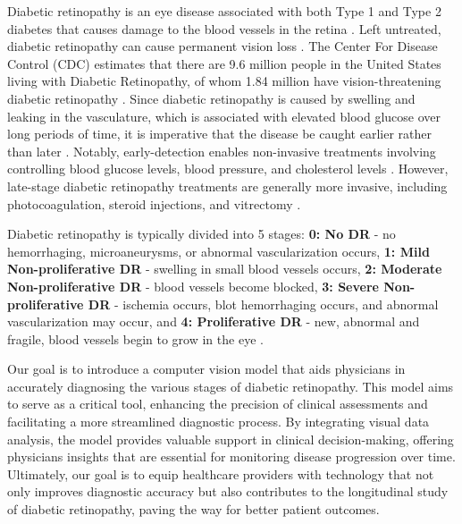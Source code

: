 Diabetic retinopathy is an eye disease associated with both Type 1 and Type 2 diabetes that causes damage to the blood vessels in the retina \cite{noauthor_diabetic_nodate}. Left untreated, diabetic retinopathy can cause permanent vision loss \cite{lee_epidemiology_2015}. The Center For Disease Control (CDC) estimates that there are 9.6 million people in the United States living with Diabetic Retinopathy, of whom 1.84 million have vision-threatening diabetic retinopathy \cite{noauthor_diabetic_2023}. Since diabetic retinopathy is caused by swelling and leaking in the vasculature, which is associated with elevated blood glucose over long periods of time, it is imperative that the disease be caught earlier rather than later \cite{hammes_diabetic_2011}. Notably, early-detection enables non-invasive treatments involving controlling blood glucose levels, blood pressure, and cholesterol levels \cite{stitt_progress_2016}. However, late-stage diabetic retinopathy treatments are generally more invasive, including photocoagulation, steroid injections, and vitrectomy \cite{stitt_progress_2016}. 

Diabetic retinopathy is typically divided into 5 stages: \textbf{0: No DR} - no hemorrhaging, microaneurysms, or abnormal vascularization occurs, \textbf{1: Mild Non-proliferative DR} - swelling in small blood vessels occurs, \textbf{2: Moderate Non-proliferative DR} - blood vessels become blocked, \textbf{3: Severe Non-proliferative DR} - ischemia occurs, blot hemorrhaging occurs, and abnormal vascularization may occur, and \textbf{4: Proliferative DR} - new, abnormal and fragile, blood vessels begin to grow in the eye \cite{yun_identification_2008}.

Our goal is to introduce a computer vision model that aids physicians in accurately diagnosing the various stages of diabetic retinopathy. This model aims to serve as a critical tool, enhancing the precision of clinical assessments and facilitating a more streamlined diagnostic process. By integrating visual data analysis, the model provides valuable support in clinical decision-making, offering physicians insights that are essential for monitoring disease progression over time. Ultimately, our goal is to equip healthcare providers with technology that not only improves diagnostic accuracy but also contributes to the longitudinal study of diabetic retinopathy, paving the way for better patient outcomes.